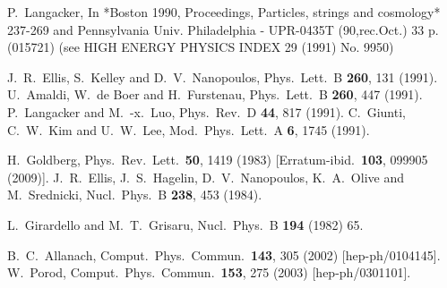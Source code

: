 \documentclass[final,3p,11pt,pdflatex]{elsarticle}
\begin{document}
\begin{thebibliography}{100}
  P.~Langacker,
  In *Boston 1990, Proceedings, Particles, strings and cosmology* 237-269 and Pennsylvania Univ. Philadelphia - UPR-0435T (90,rec.Oct.) 33 p. (015721) (see HIGH ENERGY PHYSICS INDEX 29 (1991) No. 9950)

  J.~R.~Ellis, S.~Kelley and D.~V.~Nanopoulos,
  Phys.\ Lett.\ B {\bf 260}, 131 (1991).
  U.~Amaldi, W.~de Boer and H.~Furstenau,
  Phys.\ Lett.\ B {\bf 260}, 447 (1991).
  P.~Langacker and M.~-x.~Luo,
  Phys.\ Rev.\ D {\bf 44}, 817 (1991).
  C.~Giunti, C.~W.~Kim and U.~W.~Lee,
  Mod.\ Phys.\ Lett.\ A {\bf 6}, 1745 (1991).


  H.~Goldberg,
  Phys.\ Rev.\ Lett.\  {\bf 50}, 1419 (1983)
  [Erratum-ibid.\  {\bf 103}, 099905 (2009)].
  J.~R.~Ellis, J.~S.~Hagelin, D.~V.~Nanopoulos, K.~A.~Olive and M.~Srednicki,
  Nucl.\ Phys.\ B {\bf 238}, 453 (1984).

  L.~Girardello and M.~T.~Grisaru,
  Nucl.\ Phys.\ B {\bf 194} (1982) 65.

  B.~C.~Allanach,
  Comput.\ Phys.\ Commun.\  {\bf 143}, 305 (2002)
  [hep-ph/0104145].
  W.~Porod,
  Comput.\ Phys.\ Commun.\  {\bf 153}, 275 (2003)
  [hep-ph/0301101].


\end{thebibliography}
\end{document}
